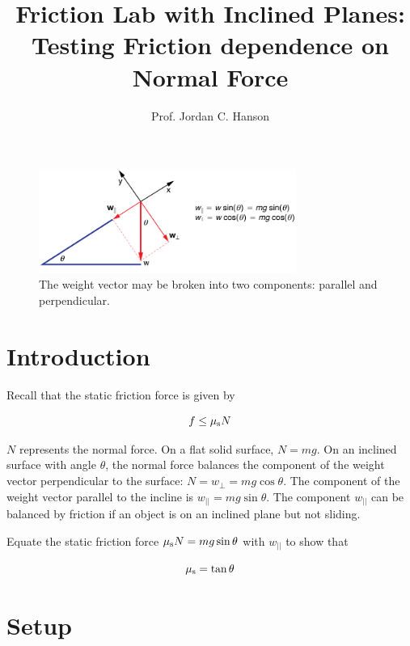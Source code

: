 \documentclass{article}
\begin{document}
\title{Friction Lab with Inclined Planes: Testing Friction dependence on Normal Force}
\author{Prof. Jordan C. Hanson}

\maketitle

\begin{figure}[ht]
\centering
\includegraphics[width=0.75\textwidth]{incline.jpeg}
\caption{\label{fig:incline} The weight vector may be broken into two components: parallel and perpendicular.}
\end{figure}

\section{Introduction}

Recall that the static friction force is given by

\begin{equation}
f \leq \mu_{\rm s} N
\end{equation}

$N$ represents the normal force.  On a flat solid surface, $N = mg$.  On an inclined surface with angle $\theta$, the normal force balances the component of the weight vector perpendicular to the surface: $N = w_{\perp} = mg \cos\theta$.  The component of the weight vector parallel to the incline is $w_{||} = mg \sin\theta$.  The component $w_{||}$ can be balanced by friction if an object is on an inclined plane but not sliding.

Equate the static friction force $\mu_{\rm s} N = mg\sin\theta$ with $w_{||}$ to show that

\begin{equation}
\mu_{\rm s} = \tan\theta
\end{equation}

\section{Setup}
\end{document}
